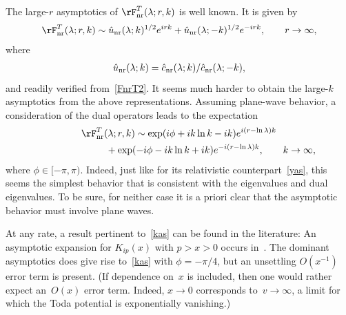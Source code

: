 \documentclass[pdftex]{sigma}
\numberwithin{equation}{section}
\begin{document}
The large-$r$ asymptotics of $\rF_{\rm nr}^T(\lambda;r,k)$ is well known. It is given by
\begin{gather}
\rF_{\rm nr}^T(\lambda;r,k)\sim \hat{u}_{\rm nr}(\lambda;k)^{1/2}e^{irk}+\hat{u}_{\rm nr}(\lambda;-k)^{1/2}e^{-irk},\qquad r\to\infty,
\end{gather}
where
\begin{gather}
\hat{u}_{\rm nr}(\lambda;k)=\hat{c}_{\rm nr}(\lambda;k)/\hat{c}_{\rm nr}(\lambda;-k),
\end{gather}
and readily verif\/ied from~\eqref{FnrT2}.
It seems much harder to obtain the large-$k$ asymptotics from the above representations. Assuming plane-wave behavior, a consideration of the dual operators leads to the expectation
\begin{gather}
\rF_{\rm nr}^T(\lambda;r,k)\sim \exp( i\phi +ik\ln k -ik)e^{i(r-\ln \lambda)k} \nonumber\\
\phantom{\rF_{\rm nr}^T(\lambda;r,k)\sim}{} +\exp(- i\phi -ik\ln k +ik)e^{-i(r-\ln \lambda)k},\qquad  k\to\infty,\label{kas}
\end{gather}
where $\phi\in[-\pi,\pi)$. Indeed, just like for its relativistic counterpart~\eqref{yas}, this seems the simplest behavior that is consistent with the eigenvalues and dual eigenvalues. To be sure,  for neither case it is a priori clear that the asymptotic behavior must involve plane waves.

At any rate, a result pertinent to~\eqref{kas} can be found in the literature: An asymptotic expansion for $K_{ip}(x)$ with $p>x>0$ occurs in~\cite[Section~7.13.2, formula~(19)]{erde}. The dominant asymptotics does give rise to~\eqref{kas} with $\phi=-\pi/4$, but an unsettling $O(x^{-1})$ error term is present. (If dependence on~$x$ is included, then one would rather expect an~$O(x)$ error term. Indeed, $x\to 0$ corresponds to~$v\to \infty$, a limit for which the Toda potential is exponentially vanishing.)

\appendix


																																												 
\end{document}
